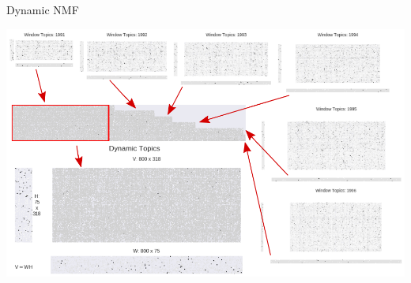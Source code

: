 \documentclass[9pt]{beamer}
\begin{document}
\begin{frame}[t]{Dynamic NMF}

\includegraphics[width=\linewidth]{../plots/sustainability/conceptual_annotated_2}

\end{frame}
\end{document}

